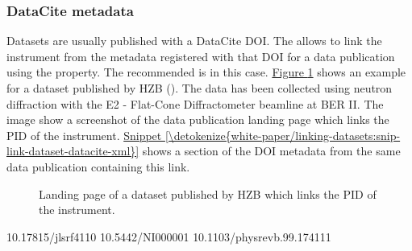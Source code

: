 \documentclass[a4paper,10pt,english]{sphinxmanual}
\begin{document}
\subsubsection{DataCite metadata}
\label{\detokenize{white-paper/linking-datasets:datacite-metadata}}
Datasets are usually published with a DataCite DOI.  The  allows to link the instrument from the metadata
registered with that DOI for a data publication using the
 property.  The recommended  is
 in this case.  \hyperref[\detokenize{white-paper/linking-datasets:fig-link-hzb}]{Figure \ref{\detokenize{white-paper/linking-datasets:fig-link-hzb}}} shows an example
for a dataset published by HZB ().
The data has been collected using neutron diffraction with the E2 -
Flat-Cone Diffractometer beamline at BER II.  The image show a
screenshot of the data publication landing page which links the PID of
the instrument.  \hyperref[\detokenize{white-paper/linking-datasets:snip-link-dataset-datacite-xml}]{Snippet \ref{\detokenize{white-paper/linking-datasets:snip-link-dataset-datacite-xml}}} shows a
section of the DOI metadata from the same data publication containing
this link.

\begin{figure}[htbp]
\centering
\capstart

\noindent{}
\caption{Landing page of a dataset published by HZB which links the PID of
the instrument.}\label{\detokenize{white-paper/linking-datasets:id4}}\label{\detokenize{white-paper/linking-datasets:fig-link-hzb}}\end{figure}
\def\sphinxLiteralBlockLabel{\label{\detokenize{white-paper/linking-datasets:id5}}\label{\detokenize{white-paper/linking-datasets:snip-link-dataset-datacite-xml}}}
\begin{sphinxVerbatim}[commandchars=\\\{\}]
      10.17815/jlsrf\PYGZhy{}4\PYGZhy{}110
      10.5442/NI000001
      10.1103/physrevb.99.174111
\end{sphinxVerbatim}
\end{document}
